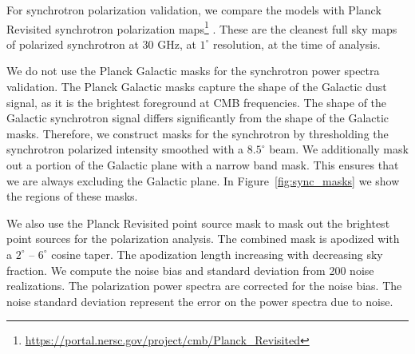 \documentclass[twocolumn]{aastex631}
\newcommand{\giuse}[1]{\textcolor{orange}{(GP: #1)}}
\begin{document}

For synchrotron polarization validation, we compare the models with Planck Revisited synchrotron polarization maps\footnote{\url{https://portal.nersc.gov/project/cmb/Planck\_Revisited}} \citep{Delabrouille:2024}. These are the cleanest full sky maps of polarized synchrotron at 30 GHz, at $1^\circ$ resolution, at the time of analysis. 

We do not use the Planck Galactic masks for the synchrotron power spectra validation. The Planck Galactic masks capture the shape of the Galactic dust signal, as it is the brightest foreground at CMB frequencies. The shape of the Galactic synchrotron signal differs significantly from the shape of the Galactic masks. Therefore, we construct masks for the synchrotron by thresholding the synchrotron polarized intensity smoothed with a $8.5^\circ$ beam. We additionally mask out a portion of the Galactic plane with a narrow band mask. This ensures that we are always excluding the Galactic plane. In Figure~\ref{fig:sync_masks} we show the regions of these masks. 

We also use the Planck Revisited point source mask to mask out the brightest point sources for the polarization analysis. The combined mask is apodized with a $2^\circ$ -- $6^\circ$ cosine taper. The apodization length increasing with decreasing sky fraction. We compute the noise bias and standard deviation from 200 noise realizations. The polarization power spectra are corrected for the noise bias. The noise standard deviation represent the error on the power spectra due to noise.
\end{document}
